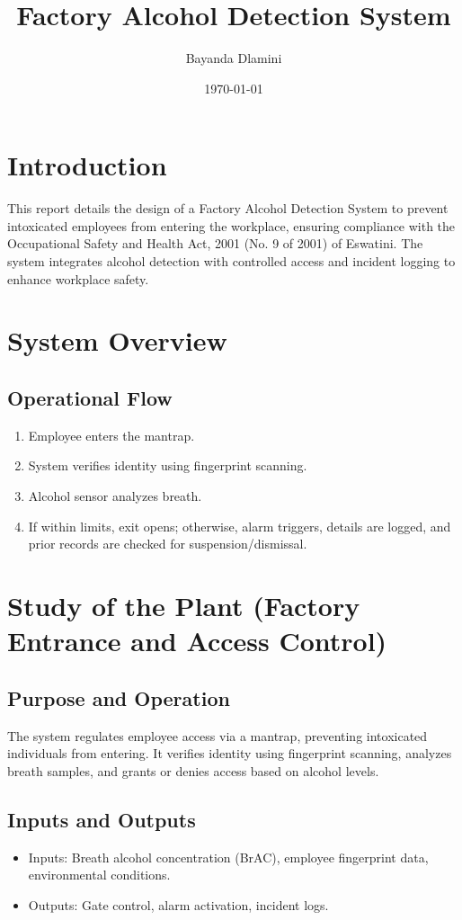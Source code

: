 \documentclass[a4paper,12pt]{article}
\title{Factory Alcohol Detection System}
\author{Bayanda Dlamini}
\date{\today}
\begin{document}
\maketitle
\section{Introduction}
This report details the design of a Factory Alcohol Detection System to prevent intoxicated employees from entering the workplace, ensuring compliance with the Occupational Safety and Health Act, 2001 (No. 9 of 2001) of Eswatini. The system integrates alcohol detection with controlled access and incident logging to enhance workplace safety.

\section{System Overview}
\subsection{Operational Flow}
\begin{enumerate}
    \item Employee enters the mantrap.
    \item System verifies identity using fingerprint scanning.
    \item Alcohol sensor analyzes breath.
    \item If within limits, exit opens; otherwise, alarm triggers, details are logged, and prior records are checked for suspension/dismissal.
\end{enumerate}

\section{Study of the Plant (Factory Entrance and Access Control)}
\subsection{Purpose and Operation}
The system regulates employee access via a mantrap, preventing intoxicated individuals from entering. It verifies identity using fingerprint scanning, analyzes breath samples, and grants or denies access based on alcohol levels.

\subsection{Inputs and Outputs}
\begin{itemize}
    \item Inputs: Breath alcohol concentration (BrAC), employee fingerprint data, environmental conditions.
    \item Outputs: Gate control, alarm activation, incident logs.
\end{itemize}
\end{document}
